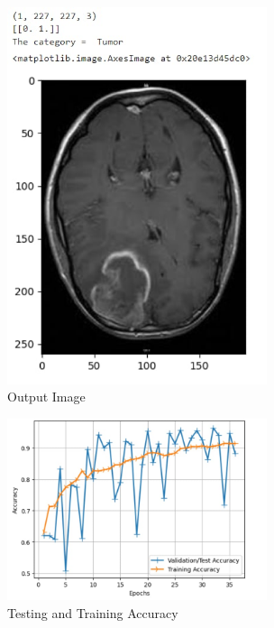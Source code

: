 \begin{figure}[H] %
\begin{center}
	\includegraphics[width=3in]{images/tumor_image.jpg} 
	\caption{Output Image} %
	\label{Output Image} %
\end{center}
\end{figure}

\begin{figure}[H] %
\begin{center}
	\includegraphics[width=3in]{images/accuracy.jpg} 
	\caption{Testing and Training Accuracy} %
	\label{Testing and Training Accuracy} %
\end{center}
\end{figure}

